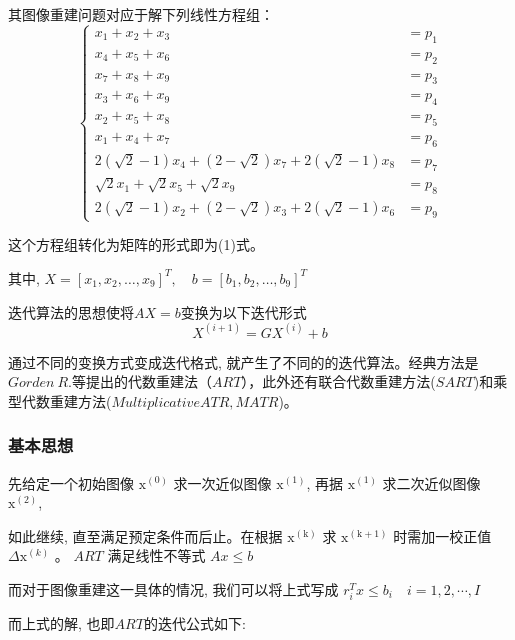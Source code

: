 \documentclass[hyperref]{ctexart}
\begin{document}
			其图像重建问题对应于解下列线性方程组：
			\begin{equation}
				\left\{\begin{aligned}
				x_{1}+x_{2}+x_{3} &=p_{1} \\
				x_{4}+x_{5}+x_{6} &=p_{2} \\
				x_{7}+x_{8}+x_{9} &=p_{3} \\
				x_{3}+x_{6}+x_{9} &=p_{4} \\
				x_{2}+x_{5}+x_{8} &=p_{5} \\
				x_{1}+x_{4}+x_{7} &=p_{6} \\
				2(\sqrt{2}-1) x_{4}+(2-\sqrt{2}) x_{7}+2(\sqrt{2}-1) x_{8}&=p_{7} \\
				\sqrt{2} x_{1}+\sqrt{2} x_{5}+\sqrt{2} x_{9}&=p_{8} \\
				2(\sqrt{2}-1) x_{2}+(2-\sqrt{2}) x_{3}+2(\sqrt{2}-1) x_{6}&=p_{9}
				\end{aligned}\right.
			\end{equation}
		
			这个方程组转化为矩阵的形式即为(1)式。
		
			其中, $X=\left[x_{1}, x_{2}, \ldots, x_{9}\right]^{T}, \quad b=\left[b_{1}, b_{2}, \ldots, b_{9}\right]^{T}$ 
		
			迭代算法的思想使将$AX=b$变换为以下迭代形式
			\begin{equation}
				X^{(i+1)}=G X^{(i)}+b
			\end{equation}
			
			通过不同的变换方式变成迭代格式, 就产生了不同的的迭代算法。经典方法是$Gorden\ R.$等提出的代数重建法（$ART$），此外还有联合代数重建方法($SART$)和乘型代数重建方法($Multiplicative ATR ,MATR$)。

			\subsubsection{基本思想}

			先给定一个初始图像 $\mathrm{x}^{(0)}$ 求一次近似图像 $\mathrm{x}^{(1)}$, 再据 $\mathrm{x}^{(1)}$ 求二次近似图像 $\mathrm{x}^{(2)}$,

			如此继续, 直至满足预定条件而后止。在根据 $\mathrm{x}^{(\mathrm{k})}$ 求 $\mathrm{x}^{(\mathrm{k}+1)}$ 时需加一校正值 $\Delta \mathrm{x}^{(k)}$ 。 $A R T$ 满足线性不等式 $A x \leq b$

			而对于图像重建这一具体的情况, 我们可以将上式写成 $r_{i}^{T} x \leq b_{i} \quad i=1,2, \cdots, I$

			而上式的解, 也即$ART$的迭代公式如下:
\end{document}
